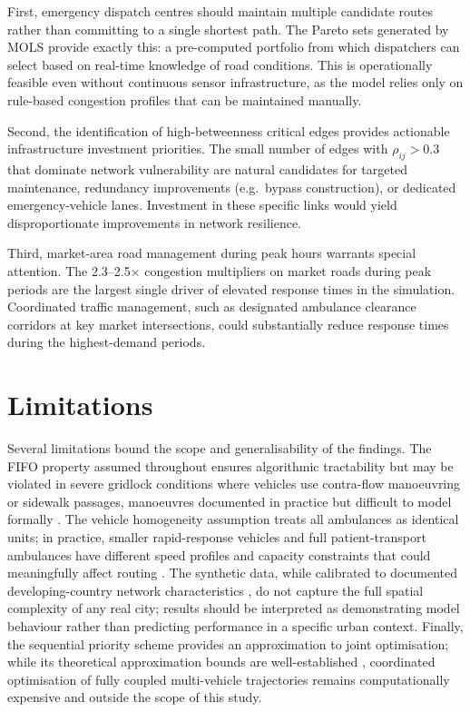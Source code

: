 \documentclass[paper=A4, 12pt, mathscr]{report}
\begin{document}
	First, emergency dispatch centres should maintain multiple candidate routes rather than committing to a single shortest path. The Pareto sets generated by MOLS provide exactly this: a pre-computed portfolio from which dispatchers can select based on real-time knowledge of road conditions. This is operationally feasible even without continuous sensor infrastructure, as the model relies only on rule-based congestion profiles that can be maintained manually.
	
	Second, the identification of high-betweenness critical edges provides actionable infrastructure investment priorities. The small number of edges with $\rho_{ij} > 0.3$ that dominate network vulnerability are natural candidates for targeted maintenance, redundancy improvements (e.g.\ bypass construction), or dedicated emergency-vehicle lanes. Investment in these specific links would yield disproportionate improvements in network resilience.
	
	Third, market-area road management during peak hours warrants special attention. The 2.3--2.5$\times$ congestion multipliers on market roads during peak periods are the largest single driver of elevated response times in the simulation. Coordinated traffic management,  such as designated ambulance clearance corridors at key market intersections,  could substantially reduce response times during the highest-demand periods.
	
	\section{Limitations}
	
	Several limitations bound the scope and generalisability of the findings. The FIFO property assumed throughout ensures algorithmic tractability but may be violated in severe gridlock conditions where vehicles use contra-flow manoeuvring or sidewalk passages,  manoeuvres documented in practice but difficult to model formally \cite{14,16}. The vehicle homogeneity assumption treats all ambulances as identical units; in practice, smaller rapid-response vehicles and full patient-transport ambulances have different speed profiles and capacity constraints that could meaningfully affect routing \cite{du}. The synthetic data, while calibrated to documented developing-country network characteristics \cite{8,9}, do not capture the full spatial complexity of any real city; results should be interpreted as demonstrating model behaviour rather than predicting performance in a specific urban context. Finally, the sequential priority scheme provides an approximation to joint optimisation; while its theoretical approximation bounds are well-established \cite{12}, coordinated optimisation of fully coupled multi-vehicle trajectories remains computationally expensive and outside the scope of this study.
	
\end{document}
